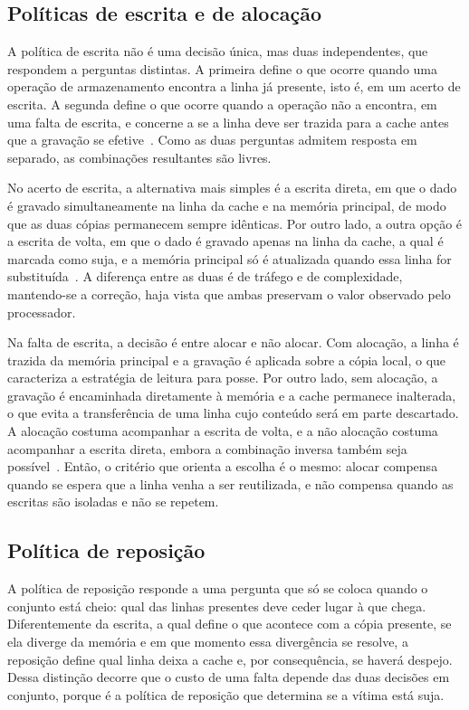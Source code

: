 \subsection{Políticas de escrita e de alocação}\label{sec:2.5.3}

A política de escrita não é uma decisão única, mas duas independentes, que respondem a perguntas distintas. A primeira define o que ocorre quando uma operação de armazenamento encontra a linha já presente, isto é, em um acerto de escrita. A segunda define o que ocorre quando a operação não a encontra, em uma falta de escrita, e concerne a se a linha deve ser trazida para a cache antes que a gravação se efetive~\cite{patterson2020computer}. Como as duas perguntas admitem resposta em separado, as combinações resultantes são livres.

No acerto de escrita, a alternativa mais simples é a escrita direta, em que o dado é gravado simultaneamente na linha da cache e na memória principal, de modo que as duas cópias permanecem sempre idênticas. Por outro lado, a outra opção é a escrita de volta, em que o dado é gravado apenas na linha da cache, a qual é marcada como suja, e a memória principal só é atualizada quando essa linha for substituída~\cite{patterson2020computer}. A diferença entre as duas é de tráfego e de complexidade, mantendo-se a correção, haja vista que ambas preservam o valor observado pelo processador.

Na falta de escrita, a decisão é entre alocar e não alocar. Com alocação, a linha é trazida da memória principal e a gravação é aplicada sobre a cópia local, o que caracteriza a estratégia de leitura para posse. Por outro lado, sem alocação, a gravação é encaminhada diretamente à memória e a cache permanece inalterada, o que evita a transferência de uma linha cujo conteúdo será em parte descartado. A alocação costuma acompanhar a escrita de volta, e a não alocação costuma acompanhar a escrita direta, embora a combinação inversa também seja possível~\cite{patterson2020computer}. Então, o critério que orienta a escolha é o mesmo: alocar compensa quando se espera que a linha venha a ser reutilizada, e não compensa quando as escritas são isoladas e não se repetem.

\subsection{Política de reposição}\label{sec:2.5.4}

A política de reposição responde a uma pergunta que só se coloca quando o conjunto está cheio: qual das linhas presentes deve ceder lugar à que chega. Diferentemente da escrita, a qual define o que acontece com a cópia presente, se ela diverge da memória e em que momento essa divergência se resolve, a reposição define qual linha deixa a cache e, por consequência, se haverá despejo. Dessa distinção decorre que o custo de uma falta depende das duas decisões em conjunto, porque é a política de reposição que determina se a vítima está suja.

